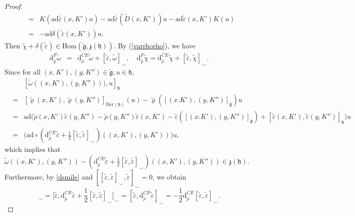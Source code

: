 \documentclass[12pt]{amsart}
\newcommand{\g}{\mathfrak g}
\newcommand{\h}{\mathfrak h}
\newcommand{\frkz}{\mathfrak z}
\newcommand{\dM}{\mathrm{d}}
\newcommand{\Hom}{\mathrm{Hom}}
\newcommand{\Der}{\mathrm{Der}}
\newcommand{\ad}{\mathrm{ad}}
\begin{document}
\begin{proof}
\begin{eqnarray*}
        &=&K(\ad\tilde{\varepsilon}(x,K')u)-\ad\tilde{\varepsilon}(\tilde{D}(x,K'))u-\ad\tilde{\varepsilon}(x,K')K(u)\\
        &=&-\ad\delta(\tilde{\varepsilon}(x, K'))u.
    \end{eqnarray*}
   Then $\tilde{\chi}+\delta(\tilde{\varepsilon})\in\Hom(\tilde{\g}, \frkz(\h))$.
    By (\ref{varrhorho}), we have  
    \begin{eqnarray*}
\dM^{F}_{\tilde{\varrho}}\tilde{\omega}&=&\dM^{CE}_{\tilde{\rho}}\tilde{\omega}+[\tilde{\varepsilon},\tilde{\omega}]_{\smile},
\quad
\dM^{F}_{\tilde{\varrho}}\tilde{\chi}=\dM^{CE}_{\tilde{\rho}}\tilde{\chi}+[\tilde{\varepsilon},\tilde{\chi}]_{\smile}.
    \end{eqnarray*}
    Since for all $(x,K'),(y,K'')\in\tilde{\g}, u\in\h$,
    \begin{eqnarray*}
       && [\tilde{\omega}((x,K'),(y,K''))), u]_\h\\
        &=&[\tilde{\varrho}(x,K'),\tilde{\varrho}(y,K'')]_{\Der(\h)}(u)-\tilde{\varrho}([(x.K'),(y,K'')]_{\tilde{\g}})u\\
        &=&\ad\Big(\tilde{\rho}(x,K')\tilde{\varepsilon}(y,K'')-\tilde{\rho}(y,K'')\tilde{\varepsilon}(x,K')-\tilde{\varepsilon}([(x.K'),(y,K'')]_{\tilde{\g}})+[\tilde{\varepsilon}(x,K'),\tilde{\varepsilon}(y,K'')]_{\h}\Big)u\\
&=&\Big(\ad\circ(\dM^{CE}_{\tilde{\rho}}\tilde{\varepsilon}+\frac{1}{2}[\tilde{\varepsilon},\tilde{\varepsilon}]_{\smile})((x,K'),(y,K'))\Big)u,
    \end{eqnarray*}
     which implies that $\tilde{\omega}((x, K'),(y,K''))-(\dM^{CE}_{\tilde{\rho}}\tilde{\varepsilon}+\frac{1}{2}[\tilde{\varepsilon},\tilde{\varepsilon}]_{\smile})((x,K'),(y,K''))\in\frkz(\h).$Furthermore, by \eqref{dsmile} and $[[\tilde{\varepsilon},\tilde{\varepsilon}]_{\smile},\tilde{\varepsilon}]_{\smile}=0$, we obtain
    \begin{equation*}
        [\tilde{\varepsilon},\tilde{\omega}]_{\smile}=\big[\tilde{\varepsilon}, \dM^{CE}_{\tilde{\rho}}\tilde{\varepsilon}+\frac{1}{2}[\tilde{\varepsilon},\tilde{\varepsilon}]_{\smile}\big]_{\smile}=[\tilde{\varepsilon},\dM^{CE}_{\tilde{\rho}}\tilde{\varepsilon}]_{\smile}=-\frac{1}{2}\dM^{CE}_{\tilde{\rho}}[\tilde{\varepsilon},\tilde{\varepsilon}]_{\smile}.

\end{equation*}
\end{proof}
\end{document}
